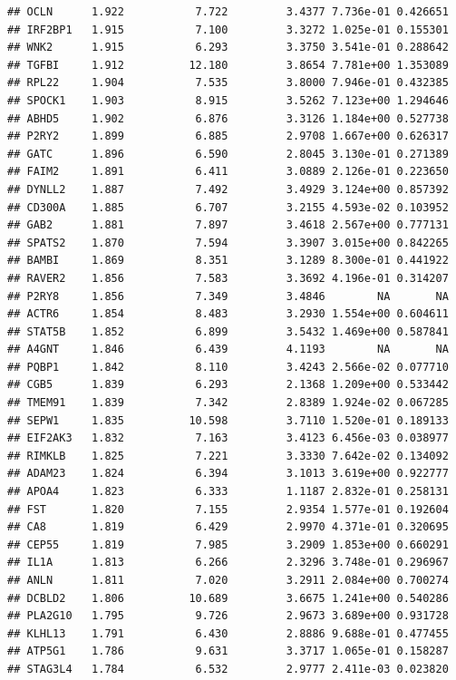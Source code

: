 \documentclass{article}\usepackage[]{graphicx}\usepackage[]{color}
\makeatletter
\newenvironment{kframe}{%
 \def\at@end@of@kframe{}%
 \ifinner\ifhmode%
  \def\at@end@of@kframe{\end{minipage}}%
  \begin{minipage}{\columnwidth}%
 \fi\fi%
 \def\FrameCommand##1{\hskip\@totalleftmargin \hskip-\fboxsep
 \colorbox{shadecolor}{##1}\hskip-\fboxsep
     \hskip-\linewidth \hskip-\@totalleftmargin \hskip\columnwidth}%
 \MakeFramed {\advance\hsize-\width
   \@totalleftmargin\z@ \linewidth\hsize
   \@setminipage}}%
 {\par\unskip\endMakeFramed%
 \at@end@of@kframe}
\newenvironment{knitrout}{}{} %
\makeatother
\begin{document}
\begin{knitrout}
\begin{kframe}
\begin{verbatim}
## OCLN      1.922           7.722         3.4377 7.736e-01 0.426651
## IRF2BP1   1.915           7.100         3.3272 1.025e-01 0.155301
## WNK2      1.915           6.293         3.3750 3.541e-01 0.288642
## TGFBI     1.912          12.180         3.8654 7.781e+00 1.353089
## RPL22     1.904           7.535         3.8000 7.946e-01 0.432385
## SPOCK1    1.903           8.915         3.5262 7.123e+00 1.294646
## ABHD5     1.902           6.876         3.3126 1.184e+00 0.527738
## P2RY2     1.899           6.885         2.9708 1.667e+00 0.626317
## GATC      1.896           6.590         2.8045 3.130e-01 0.271389
## FAIM2     1.891           6.411         3.0889 2.126e-01 0.223650
## DYNLL2    1.887           7.492         3.4929 3.124e+00 0.857392
## CD300A    1.885           6.707         3.2155 4.593e-02 0.103952
## GAB2      1.881           7.897         3.4618 2.567e+00 0.777131
## SPATS2    1.870           7.594         3.3907 3.015e+00 0.842265
## BAMBI     1.869           8.351         3.1289 8.300e-01 0.441922
## RAVER2    1.856           7.583         3.3692 4.196e-01 0.314207
## P2RY8     1.856           7.349         3.4846        NA       NA
## ACTR6     1.854           8.483         3.2930 1.554e+00 0.604611
## STAT5B    1.852           6.899         3.5432 1.469e+00 0.587841
## A4GNT     1.846           6.439         4.1193        NA       NA
## PQBP1     1.842           8.110         3.4243 2.566e-02 0.077710
## CGB5      1.839           6.293         2.1368 1.209e+00 0.533442
## TMEM91    1.839           7.342         2.8389 1.924e-02 0.067285
## SEPW1     1.835          10.598         3.7110 1.520e-01 0.189133
## EIF2AK3   1.832           7.163         3.4123 6.456e-03 0.038977
## RIMKLB    1.825           7.221         3.3330 7.642e-02 0.134092
## ADAM23    1.824           6.394         3.1013 3.619e+00 0.922777
## APOA4     1.823           6.333         1.1187 2.832e-01 0.258131
## FST       1.820           7.155         2.9354 1.577e-01 0.192604
## CA8       1.819           6.429         2.9970 4.371e-01 0.320695
## CEP55     1.819           7.985         3.2909 1.853e+00 0.660291
## IL1A      1.813           6.266         2.3296 3.748e-01 0.296967
## ANLN      1.811           7.020         3.2911 2.084e+00 0.700274
## DCBLD2    1.806          10.689         3.6675 1.241e+00 0.540286
## PLA2G10   1.795           9.726         2.9673 3.689e+00 0.931728
## KLHL13    1.791           6.430         2.8886 9.688e-01 0.477455
## ATP5G1    1.786           9.631         3.3717 1.065e-01 0.158287
## STAG3L4   1.784           6.532         2.9777 2.411e-03 0.023820

\end{verbatim}
\end{kframe}
\end{knitrout}
\end{document}
